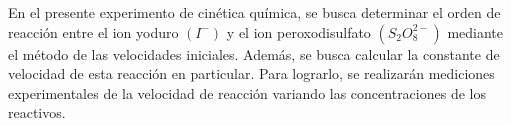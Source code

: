 \documentclass[../main.tex]{subfiles}
\begin{document}
En el presente experimento de cinética química, se busca determinar el 
orden de reacción entre el ion yoduro $(I^-)$ y el ion peroxodisulfato 
$(S_2O_8^{2-})$ mediante el método de las velocidades iniciales.  
Además, se busca calcular la constante de velocidad de esta reacción en particular. 
Para lograrlo, se realizarán mediciones experimentales de la velocidad de reacción 
variando las concentraciones de los reactivos.
\end{document}
